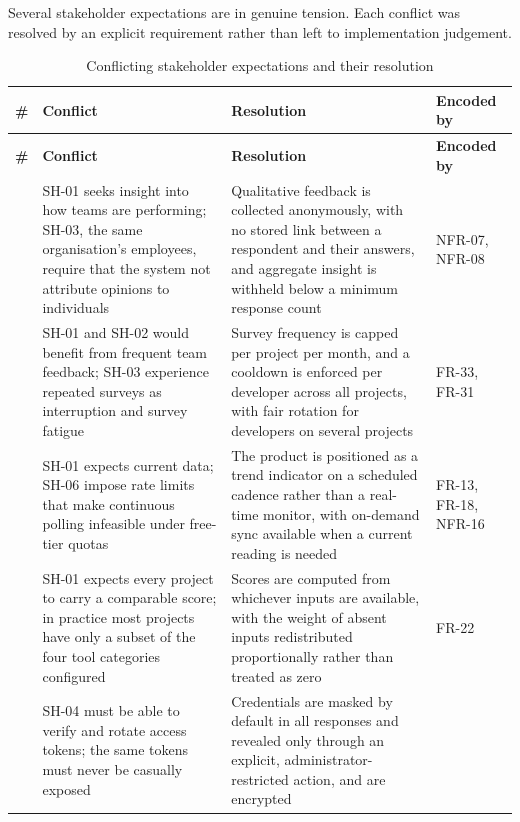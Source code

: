 Several stakeholder expectations are in genuine tension. Each conflict was
resolved by an explicit requirement rather than left to implementation judgement.

\begin{longtable}{
  >{\raggedright\arraybackslash}p{}
  >{\raggedright\arraybackslash}p{}
  >{\raggedright\arraybackslash}p{}
  >{\raggedright\arraybackslash}p{}
}
\caption{Conflicting stakeholder expectations and their resolution}
\label{tab:conflicts}\\
\toprule
\textbf{\#} & \textbf{Conflict} & \textbf{Resolution} & \textbf{Encoded by} \\
\midrule
\endfirsthead
\toprule
\textbf{\#} & \textbf{Conflict} & \textbf{Resolution} & \textbf{Encoded by} \\
\midrule
\endhead
\bottomrule
\endlastfoot
1 & SH-01 seeks insight into how teams are performing; SH-03, the same
organisation's employees, require that the system not attribute opinions to
individuals & Qualitative feedback is collected anonymously, with no stored link
between a respondent and their answers, and aggregate insight is withheld below a
minimum response count & NFR-07, NFR-08 \\
\addlinespace
2 & SH-01 and SH-02 would benefit from frequent team feedback; SH-03 experience
repeated surveys as interruption and survey fatigue & Survey frequency is capped per
project per month, and a cooldown is enforced per developer across all projects, with
fair rotation for developers on several projects & FR-33, FR-31 \\
\addlinespace
3 & SH-01 expects current data; SH-06 impose rate limits that make continuous polling
infeasible under free-tier quotas & The product is positioned as a trend indicator
on a scheduled cadence rather than a real-time monitor, with on-demand sync available
when a current reading is needed & FR-13, FR-18, NFR-16 \\
\addlinespace
4 & SH-01 expects every project to carry a comparable score; in practice most
projects have only a subset of the four tool categories configured & Scores are
computed from whichever inputs are available, with the weight of absent inputs
redistributed proportionally rather than treated as zero & FR-22 \\
\addlinespace
5 & SH-04 must be able to verify and rotate access tokens; the same tokens must never
be casually exposed & Credentials are masked by default in all responses and
revealed only through an explicit, administrator-restricted action, and are encrypted

\end{longtable}
